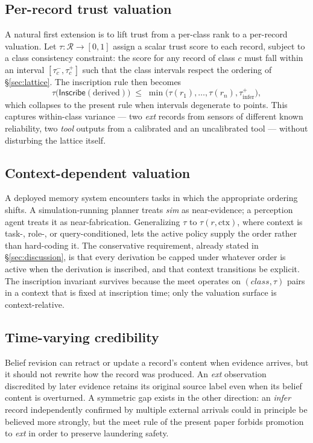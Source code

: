 \documentclass[11pt]{article}
\newcommand{\Inscribe}{\mathsf{Inscribe}}
\newcommand{\infer}{\ensuremath{\mathrm{infer}}}
\begin{document}
\subsection{Per-record trust valuation}

A natural first extension is to lift trust from a per-class rank to a per-record valuation. Let $\tau : \mathcal{R} \to [0,1]$ assign a scalar trust score to each record, subject to a class consistency constraint: the score for any record of class $c$ must fall within an interval $[\tau^{-}_c, \tau^{+}_c]$ such that the class intervals respect the ordering of \S\ref{sec:lattice}. The inscription rule then becomes
\[
\tau\bigl(\Inscribe(\text{derived})\bigr) \;\le\; \min\bigl(\tau(r_1), \ldots, \tau(r_n), \tau^{+}_{\infer}\bigr),
\]
which collapses to the present rule when intervals degenerate to points. This captures within-class variance --- two \emph{ext} records from sensors of different known reliability, two \emph{tool} outputs from a calibrated and an uncalibrated tool --- without disturbing the lattice itself.

\subsection{Context-dependent valuation}

A deployed memory system encounters tasks in which the appropriate ordering shifts. A simulation-running planner treats \emph{sim} as near-evidence; a perception agent treats it as near-fabrication. Generalizing $\tau$ to $\tau(r, \text{ctx})$, where context is task-, role-, or query-conditioned, lets the active policy supply the order rather than hard-coding it. The conservative requirement, already stated in \S\ref{sec:discussion}, is that every derivation be capped under whatever order is active when the derivation is inscribed, and that context transitions be explicit. The inscription invariant survives because the meet operates on $(class, \tau)$ pairs in a context that is fixed at inscription time; only the valuation surface is context-relative.

\subsection{Time-varying credibility}

Belief revision can retract or update a record's content when evidence arrives, but it should not rewrite how the record was produced. An \emph{ext} observation discredited by later evidence retains its original source label even when its belief content is overturned. A symmetric gap exists in the other direction: an \emph{infer} record independently confirmed by multiple external arrivals could in principle be believed more strongly, but the meet rule of the present paper forbids promotion to \emph{ext} in order to preserve laundering safety.
\end{document}
